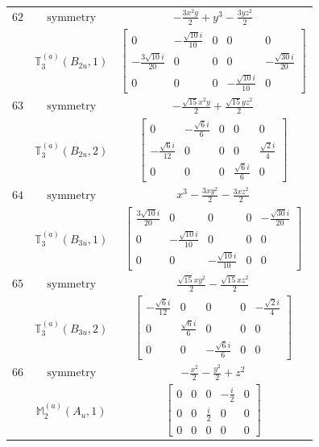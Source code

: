 \documentclass[fleqn,8pt,landscape]{jsarticle}
\begin{document}
\begin{longtable}{ccc}
$ 62 $ & $ \text{symmetry} $ & $ - \frac{3 x^{2} y}{2} + y^{3} - \frac{3 y z^{2}}{2} $ \\
$  $ & $ \mathbb{T}_{3}^{(a)}(B_{2u},1) $ & $ \begin{bmatrix} 0 & - \frac{\sqrt{10} i}{10} & 0 & 0 & 0 \\ - \frac{3 \sqrt{10} i}{20} & 0 & 0 & 0 & - \frac{\sqrt{30} i}{20} \\ 0 & 0 & 0 & - \frac{\sqrt{10} i}{10} & 0 \end{bmatrix} $ \\ \hline
$ 63 $ & $ \text{symmetry} $ & $ - \frac{\sqrt{15} x^{2} y}{2} + \frac{\sqrt{15} y z^{2}}{2} $ \\
$  $ & $ \mathbb{T}_{3}^{(a)}(B_{2u},2) $ & $ \begin{bmatrix} 0 & - \frac{\sqrt{6} i}{6} & 0 & 0 & 0 \\ - \frac{\sqrt{6} i}{12} & 0 & 0 & 0 & \frac{\sqrt{2} i}{4} \\ 0 & 0 & 0 & \frac{\sqrt{6} i}{6} & 0 \end{bmatrix} $ \\ \hline
$ 64 $ & $ \text{symmetry} $ & $ x^{3} - \frac{3 x y^{2}}{2} - \frac{3 x z^{2}}{2} $ \\
$  $ & $ \mathbb{T}_{3}^{(a)}(B_{3u},1) $ & $ \begin{bmatrix} \frac{3 \sqrt{10} i}{20} & 0 & 0 & 0 & - \frac{\sqrt{30} i}{20} \\ 0 & - \frac{\sqrt{10} i}{10} & 0 & 0 & 0 \\ 0 & 0 & - \frac{\sqrt{10} i}{10} & 0 & 0 \end{bmatrix} $ \\ \hline
$ 65 $ & $ \text{symmetry} $ & $ \frac{\sqrt{15} x y^{2}}{2} - \frac{\sqrt{15} x z^{2}}{2} $ \\
$  $ & $ \mathbb{T}_{3}^{(a)}(B_{3u},2) $ & $ \begin{bmatrix} - \frac{\sqrt{6} i}{12} & 0 & 0 & 0 & - \frac{\sqrt{2} i}{4} \\ 0 & \frac{\sqrt{6} i}{6} & 0 & 0 & 0 \\ 0 & 0 & - \frac{\sqrt{6} i}{6} & 0 & 0 \end{bmatrix} $ \\ \hline
$ 66 $ & $ \text{symmetry} $ & $ - \frac{x^{2}}{2} - \frac{y^{2}}{2} + z^{2} $ \\
$  $ & $ \mathbb{M}_{2}^{(a)}(A_{u},1) $ & $ \begin{bmatrix} 0 & 0 & 0 & - \frac{i}{2} & 0 \\ 0 & 0 & \frac{i}{2} & 0 & 0 \\ 0 & 0 & 0 & 0 & 0 \end{bmatrix} $ \\ \hline

\end{longtable}
\end{document}
